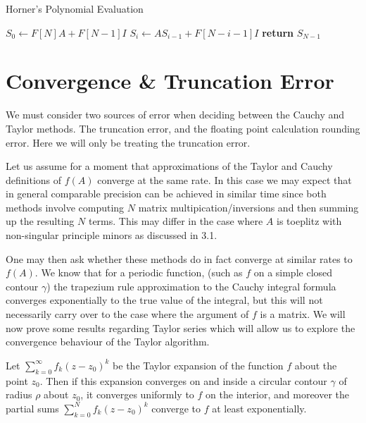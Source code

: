 \documentclass{article}
\begin{document}
\begin{algorithm}\caption{Horner's Polynomial Evaluation}\label{exp_sqr}\begin{algorithmic}[1] 
    \State $S_0 \gets F[N]A +F[N-1]I$ 
        \State $S_{i} \gets AS_{i-1}+F[N-i-1]I$
    \EndFor
    \State \textbf{return} $S_{N-1}$
    \EndProcedure
\end{algorithmic}
\end{algorithm}

\section{Convergence \& Truncation Error}

We must consider two sources of error when deciding between the Cauchy and Taylor methods. The truncation error, and the floating point calculation rounding error. Here we will only be treating the truncation error.

Let us assume for a moment that approximations of the Taylor and Cauchy definitions of $f(A)$ converge at the same rate. In this case we may expect that in general comparable precision can be achieved in similar time since both methods involve computing $N$ matrix multipication/inversions and then summing up the resulting $N$ terms. This may differ in the case where $A$ is toeplitz with non-singular principle minors as discussed in 3.1.

One may then ask whether these methods do in fact converge at similar rates to $f(A)$. We know that for a periodic function, (such as $f$ on a simple closed contour $\gamma$) the trapezium rule approximation to the Cauchy integral formula converges exponentially to the true value of the integral, but this will not necessarily carry over to the case where the argument of $f$ is a matrix. We will now prove some results regarding Taylor series which will allow us to explore the convergence behaviour of the Taylor algorithm.

\begin{theorem}
     Let $\sum_{k = 0}^\infty f_k(z-z_0)^k$ be the Taylor expansion of the function $f$ about the point $z_0$. Then if this expansion converges on and inside a circular contour $\gamma$ of radius $\rho$ about $z_0$, it converges uniformly to $f$ on the interior, and moreover the partial sums $\sum_{k = 0}^N f_k(z-z_0)^k$ converge to $f$ at least exponentially.
\end{theorem}
\end{document}
